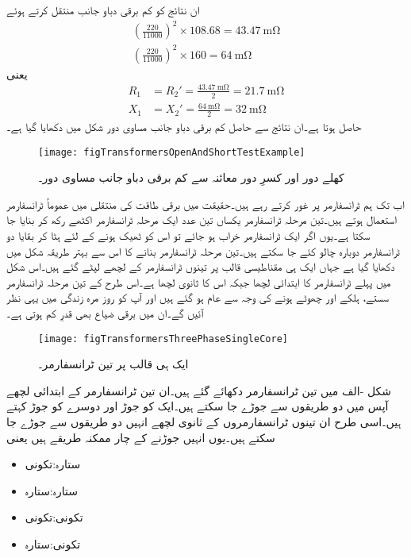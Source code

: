 ان نتائج کو کم برقی دباو جانب منتقل کرتے ہوئے 
\begin{align*}
\left(\frac{220}{11000} \right)^2 \times 108.68=\SI{43.47}{\milli \ohm}\\
\left(\frac{220}{11000} \right)^2 \times 160=\SI{64}{\milli \ohm}
\end{align*}
یعنی
\begin{align*}
R_1&=R_2'=\frac{\SI{43.47}{\milli \ohm}}{2}=\SI{21.7}{\milli \ohm}\\
X_1&=X_2'=\frac{\SI{64}{\milli \ohm}}{2}=\SI{32}{\milli \ohm}
\end{align*}
حاصل ہوتا ہے۔ان نتائج سے حاصل کم برقی دباو جانب مساوی دور شکل  میں دکھایا گیا ہے۔
\begin{figure}
\centering
\texttt{[image: figTransformersOpenAndShortTestExample]}
\caption{کھلے دور اور کسرِ دور معائنہ سے کم برقی دباو جانب  مساوی دور۔}
\label{شکل_ٹرانسفارمر_کھلے_سرے_کسر_دور_مثال}
\end{figure}
%
اب تک ہم   ٹرانسفارمر پر غور کرتے رہے ہیں۔حقیقت میں برقی طاقت کی منتقلی میں عموماً  ٹرانسفارمر استعمال ہوتے ہیں۔تین مرحلہ ٹرانسفارمر یکساں تین عدد  ایک مرحلہ  ٹرانسفارمر اکٹھے رکھ کر بنایا جا سکتا ہے۔یوں اگر ایک ٹرانسفارمر خراب ہو جائے تو اس کو ٹھیک ہونے کے لئے ہٹا کر بقایا دو ٹرانسفارمر دوبارہ چالو کئے جا سکتے ہیں۔تین مرحلہ ٹرانسفارمر بنانے کا اس سے بہتر طریقہ شکل  میں دکھایا گیا ہے جہاں ایک ہی مقناطیسی قالب پر تینوں ٹرانسفارمر کے لچھے لپٹے گئے ہیں۔اس شکل میں  پہلے ٹرانسفارمر کا ابتدائی لچھا جبکہ  اس کا ثانوی لچھا ہے۔اس طرح کے تین مرحلہ ٹرانسفارمر سستے، ہلکے اور چھوٹے ہونے کی وجہ سے عام ہو گئے ہیں اور آپ کو روز مرہ زندگی میں یہی نظر آئیں گے۔ان میں برقی ضیاع بھی قدرِ کم ہوتی ہے۔
\begin{figure}
\centering
\texttt{[image: figTransformersThreePhaseSingleCore]}
\caption{ایک ہی قالب پر تین ٹرانسفارمر۔}
\label{شکل_ٹرانسفارمر_ایک_مرکز_تین-ٹرانسفارمر}
\end{figure}

شکل -الف میں تین ٹرانسفارمر دکھائے گئے ہیں۔ان تین ٹرانسفارمر کے ابتدائی لچھے آپس میں دو طریقوں سے جوڑے جا سکتے ہیں۔ایک کو  جوڑ   اور دوسرے کو  جوڑ     کہتے ہیں۔اسی طرح ان تینوں ٹرانسفارمروں کے ثانوی  لچھے انہیں دو طریقوں سے جوڑے جا سکتے ہیں۔یوں انہیں جوڑنے کے چار ممکنہ طریقے ہیں یعنی
\begin{itemize}
\item
ستارہ:تکونی  \quad {}
\item
ستارہ:ستارہ \quad  {}
\item
تکونی:تکونی \quad  {}
\item
تکونی:ستارہ  \quad  {}
\end{itemize}

